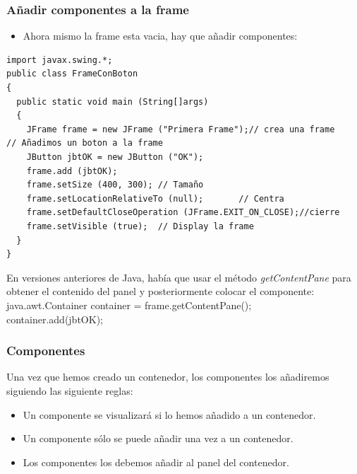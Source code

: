 \documentclass{beamer}
\begin{document}
\begin{frame}[fragile]
    \frametitle{Añadir componentes a la frame}
\begin{footnotesize}
\begin{itemize}[<+-| alert@+>]
      \item Ahora mismo la frame esta vacia, hay que añadir componentes:
        
\end{itemize}
\begin{verbatim}
import javax.swing.*;
public class FrameConBoton
{
  public static void main (String[]args)
  {
    JFrame frame = new JFrame ("Primera Frame");// crea una frame
// Añadimos un boton a la frame
    JButton jbtOK = new JButton ("OK");
    frame.add (jbtOK);
    frame.setSize (400, 300); // Tamaño
    frame.setLocationRelativeTo (null);       // Centra
    frame.setDefaultCloseOperation (JFrame.EXIT_ON_CLOSE);//cierre
    frame.setVisible (true);  // Display la frame
  }
}
\end{verbatim}

\pause
En versiones anteriores de Java, había que usar el método \emph{getContentPane} para obtener el contenido del panel y posteriormente colocar el componente:\\
\alert{java.awt.Container container = frame.getContentPane();}\\
\alert{container.add(jbtOK);}
\end{footnotesize}
\end{frame}


\begin{frame}
\frametitle{Componentes}
Una vez que hemos creado un contenedor, los componentes los añadiremos siguiendo las siguiente reglas:
\begin{itemize}[<+->]
\item Un componente se visualizará si lo hemos añadido a un contenedor.
\item Un componente sólo se puede añadir una vez a un contenedor.
\item Los componentes los debemos añadir al panel del contenedor.
\end{itemize}
\end{frame}
\end{document}

